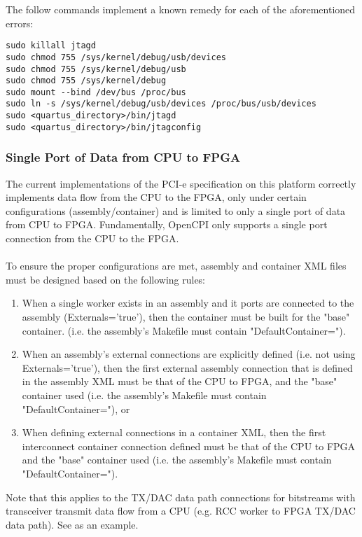 \noindent The follow commands implement a known remedy for each of the aforementioned errors:
\begin{lstlisting}
sudo killall jtagd
sudo chmod 755 /sys/kernel/debug/usb/devices
sudo chmod 755 /sys/kernel/debug/usb
sudo chmod 755 /sys/kernel/debug
sudo mount --bind /dev/bus /proc/bus
sudo ln -s /sys/kernel/debug/usb/devices /proc/bus/usb/devices
sudo <quartus_directory>/bin/jtagd
sudo <quartus_directory>/bin/jtagconfig
\end{lstlisting}

\subsubsection*{Single Port of Data from CPU to FPGA} %
\label{bug:3783}
The current implementations of the PCI-e specification on this platform correctly implements data flow from the CPU to the FPGA, only under certain configurations (assembly/container) and is limited to only a single port of data from CPU to FPGA. Fundamentally, OpenCPI only supports a single port connection from the CPU to the FPGA. \\ \\
To ensure the proper configurations are met, assembly and container XML files must be designed based on the following rules:
\begin{enumerate}
\item When a single worker exists in an assembly and it ports are connected to the assembly (Externals='true'), then
the container must be built for the "base" container. (i.e. the assembly's Makefile must contain "DefaultContainer=").
\item When an assembly's external connections are explicitly defined (i.e. not using Externals='true'), then the first external assembly connection that is defined in the assembly XML must be that of the CPU to FPGA, and the "base" container used (i.e. the assembly's Makefile must contain "DefaultContainer="), or
\item When defining external connections in a container XML, then the first interconnect container connection defined must be that of the CPU to FPGA and the "base" container used (i.e. the assembly's Makefile must contain "DefaultContainer=").
\end{enumerate}
Note that this applies to the TX/DAC data path connections for bitstreams with transceiver transmit data flow from a CPU (e.g. RCC worker to FPGA TX/DAC data path). See  as an example.

